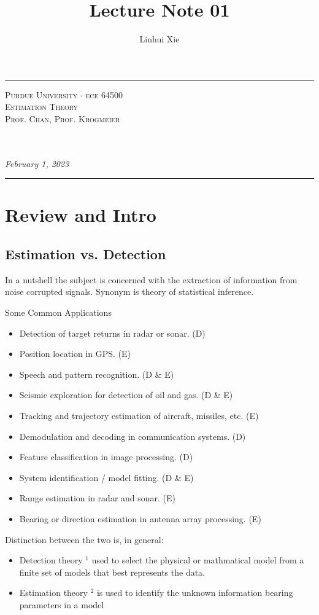 \documentclass[12pt,thmsa]{article}
\author{Linhui Xie}
\title{Lecture Note 01}
\makeatletter
\def\maketitle{%
	\par
	\hrule height 1.5pt\vspace{1ex}
	\par\noindent
	
	\begin{minipage}{0.5\textwidth}
		\scshape
		Purdue University $\cdot$ ece 64500 \\[1ex]
		Estimation Theory \\
		Prof. Chan, Prof. Krogmeier
	\end{minipage}
	\begin{minipage}{0.45\textwidth}
		\raggedleft
		\MakeTextUppercase{{\@title}}\\[0.3ex] %
		\textit{\@author}\\[0.2ex]
		\textit{February 1, 2023}
	\end{minipage}
	\par\vspace{1ex}
	\hrule height 1.5pt\vspace{1ex}
	\par
}
\makeatother
\begin{document}
\maketitle

\setcounter{section}{0}
\section{Review and Intro}
\setcounter{section}{1}

\subsection{ Estimation vs. Detection}
In a nutshell the subject is concerned with the extraction of information from noise corrupted signals. Synonym is theory of statistical inference.

Some Common Applications

\begin{itemize}
	\item Detection of target returns in radar or sonar. (D)
	\item Position location in GPS. (E)
	\item Speech and pattern recognition. (D \& E)
	\item Seismic exploration for detection of oil and gas. (D \& E)
	\item Tracking and trajectory estimation of aircraft, missiles, etc. (E)
	\item Demodulation and decoding in communication systems. (D)
	\item Feature classification in image processing. (D)
	\item System identification / model fitting. (D \& E)
	\item Range estimation in radar and sonar. (E)
	\item Bearing or direction estimation in antenna array processing. (E)
\end{itemize}

Distinction between the two is, in general:

\begin{itemize}
	\item Detection theory ${ }^{1}$ used to select the physical or mathmatical model from a finite set of models that best represents the data.
	\item Estimation theory ${ }^{2}$ is used to identify the unknown information bearing parameters in a model
\end{itemize}
\end{document}
